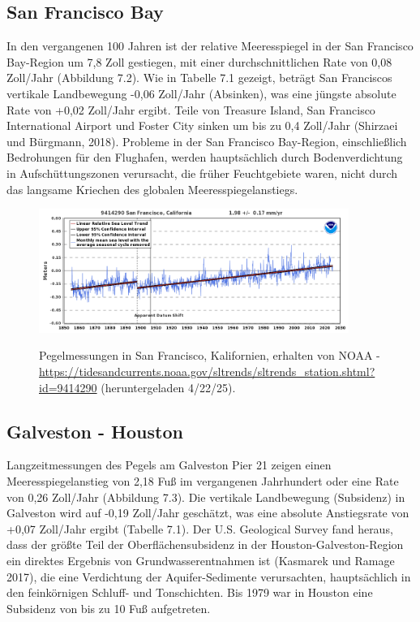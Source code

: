 \documentclass[12pt,paper=a4,DIV=12,parskip=never,chapterprefix=false,headings=standardclasses]{scrreprt}
\begin{document}
\subsection*{San Francisco Bay}
In den vergangenen 100 Jahren ist der relative Meeresspiegel in der San Francisco Bay-Region um 7,8 Zoll gestiegen, mit einer durchschnittlichen Rate von 0,08 Zoll/Jahr (Abbildung 7.2). Wie in Tabelle 7.1 gezeigt, beträgt San Franciscos vertikale Landbewegung -0,06 Zoll/Jahr (Absinken), was eine jüngste absolute Rate von +0,02 Zoll/Jahr ergibt. Teile von Treasure Island, San Francisco International Airport und Foster City sinken um bis zu 0,4 Zoll/Jahr (Shirzaei und Bürgmann, 2018). Probleme in der San Francisco Bay-Region, einschließlich Bedrohungen für den Flughafen, werden hauptsächlich durch Bodenverdichtung in Aufschüttungszonen verursacht, die früher Feuchtgebiete waren, nicht durch das langsame Kriechen des globalen Meeresspiegelanstiegs.

\begin{figure}[H]
\begin{center}
\includegraphics[width=0.9\textwidth]{bilder/bilderKlima-0069.png}\\[1cm]
\end{center}
\caption{Pegelmessungen in San Francisco, Kalifornien, erhalten von NOAA - \url{https://tidesandcurrents.noaa.gov/sltrends/sltrends_station.shtml?id=9414290} (heruntergeladen 4/22/25).}
\end{figure}

\subsection*{Galveston - Houston}
Langzeitmessungen des Pegels am Galveston Pier 21 zeigen einen Meeresspiegelanstieg von 2,18 Fuß im vergangenen Jahrhundert oder eine Rate von 0,26 Zoll/Jahr (Abbildung 7.3). Die vertikale Landbewegung (Subsidenz) in Galveston wird auf -0,19 Zoll/Jahr geschätzt, was eine absolute Anstiegsrate von +0,07 Zoll/Jahr ergibt (Tabelle 7.1). Der U.S. Geological Survey fand heraus, dass der größte Teil der Oberflächensubsidenz in der Houston-Galveston-Region ein direktes Ergebnis von Grundwasserentnahmen ist (Kasmarek und Ramage 2017), die eine Verdichtung der Aquifer-Sedimente verursachten, hauptsächlich in den feinkörnigen Schluff- und Tonschichten. Bis 1979 war in Houston eine Subsidenz von bis zu 10 Fuß aufgetreten.
\end{document}
